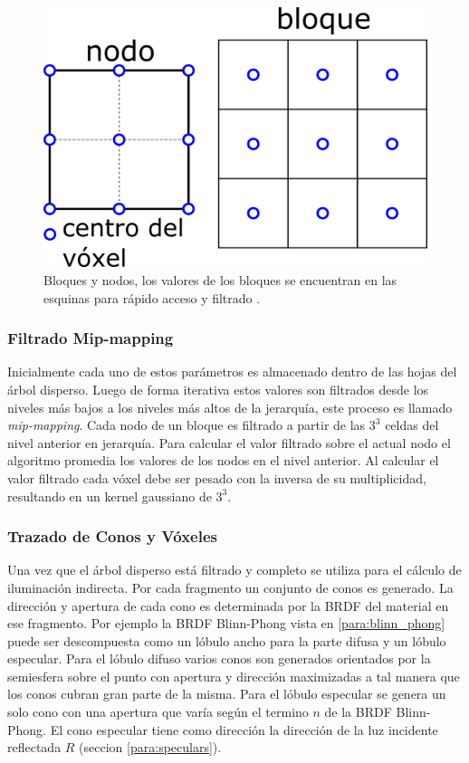 \begin{figure}[H]
	\centering
	\includegraphics[width=0.3\linewidth]{media/bricks_vct.png}
	\caption{Bloques y nodos, los valores de los bloques se encuentran en las esquinas para rápido acceso y filtrado \cite{CNSGE11b}.}
	\label{fig:bricks_vct}
\end{figure}

\subsubsection{Filtrado Mip-mapping}
\label{subsub:mipmaping_orig}
Inicialmente cada uno de estos parámetros es almacenado dentro de las hojas del árbol disperso. Luego de forma iterativa estos valores son filtrados desde los niveles más bajos a los niveles más altos de la jerarquía, este proceso es llamado \emph{mip-mapping}. Cada nodo de un bloque es filtrado a partir de las $3^3$ celdas del nivel anterior en jerarquía. Para calcular el valor filtrado sobre el actual nodo el algoritmo promedia los valores de los nodos en el nivel anterior. Al calcular el valor filtrado cada vóxel debe ser pesado con la inversa de su multiplicidad, resultando en un kernel gaussiano de $3^3$. 

\subsubsection{Trazado de Conos y Vóxeles}
Una vez que el árbol disperso está filtrado y completo se utiliza para el cálculo de iluminación indirecta. Por cada fragmento un conjunto de conos es generado. La dirección y apertura de cada cono es determinada por la \ac{BRDF} del material en ese fragmento. Por ejemplo la \ac{BRDF} Blinn-Phong vista en \ref{para:blinn_phong} puede ser descompuesta como un lóbulo ancho para la parte difusa y un lóbulo especular. Para el lóbulo difuso varios conos son generados orientados por la semiesfera sobre el punto con apertura y dirección maximizadas a tal manera que los conos cubran gran parte de la misma. Para el lóbulo especular se genera un solo cono con una apertura que varía según el termino $n$ de la \ac{BRDF} Blinn-Phong. El cono especular tiene como dirección la dirección de la luz incidente reflectada $R$ (seccion \ref{para:speculars}).


